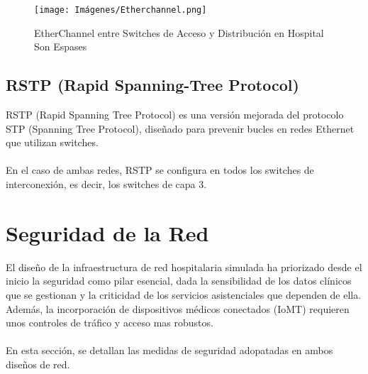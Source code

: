 \begin{figure}[H]
    \centering
    \texttt{[image: Imágenes/Etherchannel.png]}
    \caption{EtherChannel entre Switches de Acceso y Distribución en Hospital Son Espases}
    \label{fig:EtherChannel}
\end{figure}

\subsection{RSTP (Rapid Spanning-Tree Protocol)}
RSTP (Rapid Spanning Tree Protocol) es una versión mejorada del protocolo STP (Spanning Tree Protocol), diseñado para prevenir bucles en redes Ethernet que utilizan switches.
\\ \\
En el caso de ambas redes, RSTP se configura en todos los switches de interconexión, es decir, los switches de capa 3.

\section{Seguridad de la Red}
El diseño de la infraestructura de red hospitalaria simulada ha priorizado desde el inicio la seguridad como pilar esencial, dada la sensibilidad de los datos clínicos que se 
gestionan y la criticidad de los servicios asistenciales que dependen de ella. Además, la incorporación de dispositivos médicos conectados (IoMT) requieren unos controles de tráfico y 
acceso mas robustos.
\\ \\
En esta sección, se detallan las medidas de seguridad adopatadas en ambos diseños de red.
